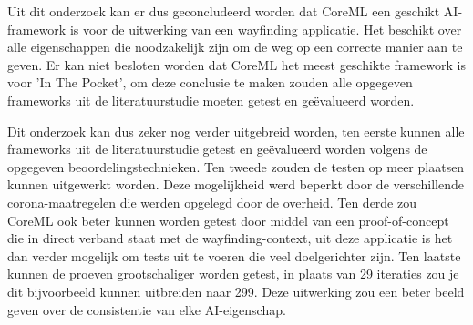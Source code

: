 
Uit dit onderzoek kan er dus geconcludeerd worden dat CoreML een geschikt AI-framework is voor de uitwerking van een wayfinding applicatie. Het beschikt over alle eigenschappen die noodzakelijk zijn om de weg op een correcte manier aan te geven. Er kan niet besloten worden dat CoreML het meest geschikte framework is voor 'In The Pocket', om deze conclusie te maken zouden alle opgegeven frameworks uit de literatuurstudie moeten getest en geëvalueerd worden.

Dit onderzoek kan dus zeker nog verder uitgebreid worden, ten eerste kunnen alle frameworks uit de literatuurstudie getest en geëvalueerd worden volgens de opgegeven beoordelingstechnieken. Ten tweede zouden de testen op meer plaatsen kunnen uitgewerkt worden. Deze mogelijkheid werd beperkt door de verschillende corona-maatregelen die werden opgelegd door de overheid. Ten derde zou CoreML ook beter kunnen worden getest door middel van een proof-of-concept die in direct verband staat met de wayfinding-context, uit deze applicatie is het dan verder mogelijk om tests uit te voeren die veel doelgerichter zijn. Ten laatste kunnen de proeven grootschaliger worden getest, in plaats van 29 iteraties zou je dit bijvoorbeeld kunnen uitbreiden naar 299. Deze uitwerking zou een beter beeld geven over de consistentie van elke AI-eigenschap.